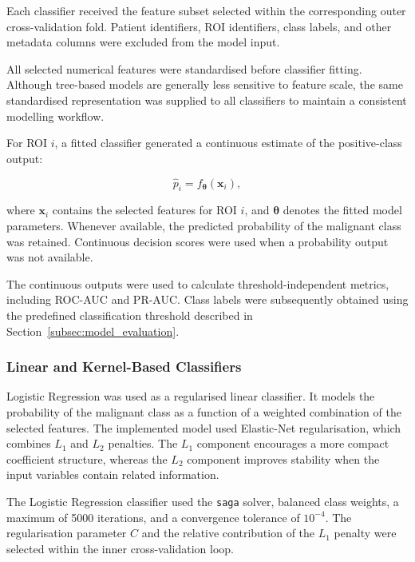 \documentclass[12pt,twocolumn]{article}
\begin{document}
Each classifier received the feature subset selected within the
corresponding outer cross-validation fold. Patient identifiers, ROI
identifiers, class labels, and other metadata columns were excluded
from the model input.

All selected numerical features were standardised before classifier
fitting. Although tree-based models are generally less sensitive to
feature scale, the same standardised representation was supplied to
all classifiers to maintain a consistent modelling workflow.

For ROI \(i\), a fitted classifier generated a continuous estimate of
the positive-class output:

\begin{equation}
\widehat{p}_i
=
f_{\boldsymbol{\theta}}
\left(
\mathbf{x}_i
\right),
\label{eq:classifier_output}
\end{equation}

where \(\mathbf{x}_i\) contains the selected features for ROI \(i\),
and \(\boldsymbol{\theta}\) denotes the fitted model parameters.
Whenever available, the predicted probability of the malignant class
was retained. Continuous decision scores were used when a probability
output was not available.

The continuous outputs were used to calculate threshold-independent
metrics, including ROC-AUC and PR-AUC. Class labels were subsequently
obtained using the predefined classification threshold described in
Section~\ref{subsec:model_evaluation}.




\subsubsection{Linear and Kernel-Based Classifiers}
\label{subsubsec:linear_kernel_classifiers}

Logistic Regression was used as a regularised linear classifier. It
models the probability of the malignant class as a function of a
weighted combination of the selected features. The implemented model
used Elastic-Net regularisation, which combines \(L_1\) and \(L_2\)
penalties. The \(L_1\) component encourages a more compact coefficient
structure, whereas the \(L_2\) component improves stability when the
input variables contain related information.

The Logistic Regression classifier used the \texttt{saga} solver,
balanced class weights, a maximum of 5000 iterations, and a convergence
tolerance of \(10^{-4}\). The regularisation parameter \(C\) and the
relative contribution of the \(L_1\) penalty were selected within the
inner cross-validation loop.
\end{document}
